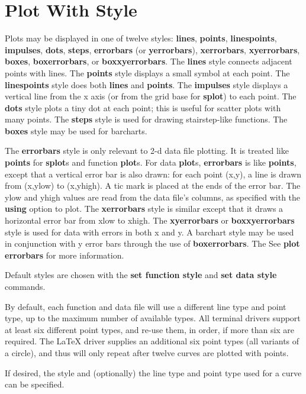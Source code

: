 \section{Plot With Style}
Plots may be displayed in one of twelve styles: {\bf lines}, {\bf points},
{\bf linespoints}, {\bf impulses}, {\bf dots}, {\bf steps},
{\bf errorbars} (or {\bf yerrorbars}), {\bf xerrorbars}, {\bf xyerrorbars},
{\bf boxes}, {\bf boxerrorbars}, or {\bf boxxyerrorbars}. The {\bf lines} style
connects adjacent points with lines. The {\bf points} style displays a
small symbol at each point. The {\bf linespoints} style does both
{\bf lines} and {\bf points}. The {\bf impulses} style displays a vertical line
from the x axis (or from the grid base for {\bf splot}) to each point. The
{\bf dots} style plots a tiny dot at each point; this is useful for
scatter plots with many points. The {\bf steps} style is used for drawing 
stairstep-like functions. The {\bf boxes} style may be used for barcharts.

The {\bf errorbars} style is only relevant to 2-d data file plotting. It
is treated like {\bf points} for {\bf splot}s and function {\bf plot}s. For 
data
{\bf plot}s, {\bf errorbars} is like {\bf points}, except that a vertical error
bar is also drawn: for each point (x,y), a line is drawn from
(x,ylow) to (x,yhigh). A tic mark is placed at the ends of the error
bar. The ylow and yhigh values are read from the data file's columns,
as specified with the {\bf using} option to plot. The {\bf xerrorbars}
style is similar except that it draws a horizontal error bar from xlow to
xhigh. The {\bf xyerrorbars} or {\bf boxxyerrorbars} style is used for data 
with errors in both x and y. A barchart style may be used in conjunction with y 
error bars through the use of {\bf boxerrorbars}. The See {\bf plot errorbars} 
for more information.

Default styles are chosen with the {\bf set function style} and
{\bf set data style} commands.

By default, each function and data file will use a different
line type and point type, up to the maximum number of available
types. All terminal drivers support at least six different point
types, and re-use them, in order, if more than six are required.
The LaTeX driver supplies an additional six point types (all variants
of a circle), and thus will only repeat after twelve curves are
plotted with points.

If desired, the style and (optionally) the line type and point type
used for a curve can be specified.

